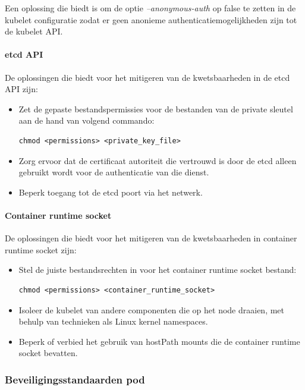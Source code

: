 Een oplossing die \textcite{OWASP-2023} biedt is om de optie \textit{--anonymous-auth} op false te zetten in de kubelet configuratie zodat er geen anonieme authenticatiemogelijkheden zijn tot de kubelet API.

\paragraph{etcd API}
De oplossingen die \textcite{KubernetesDocs-2023} biedt voor het mitigeren van de kwetsbaarheden in de etcd API zijn:
\begin{itemize}
    \item Zet de gepaste bestandspermissies voor de bestanden van de private sleutel aan de hand van volgend commando:
\begin{lstlisting}[language=tex, caption={Opzetten gepaste bestandspermissies voor private sleutel}]
chmod <permissions> <private_key_file>
\end{lstlisting}
    \item Zorg ervoor dat de certificaat autoriteit die vertrouwd is door de etcd alleen gebruikt wordt voor de authenticatie van die dienst. 
    \item Beperk toegang tot de etcd poort via het netwerk.
\end{itemize}

\paragraph{Container runtime socket}
De oplossingen die \textcite{KubernetesDocs-2023} biedt voor het mitigeren van de kwetsbaarheden in container runtime socket zijn:
\begin{itemize}
    \item Stel de juiste bestandsrechten in voor het container runtime socket bestand:
\begin{lstlisting}[language=tex, caption={Opzetten juiste bestandsrechten voor container runtime socket}]
chmod <permissions> <container_runtime_socket>
\end{lstlisting}
    \item Isoleer de kubelet van andere componenten die op het node draaien, met behulp van technieken als Linux kernel namespaces.
    \item Beperk of verbied het gebruik van hostPath mounts die de container runtime socket bevatten.
\end{itemize}

\subsubsection{Beveiligingsstandaarden pod}
